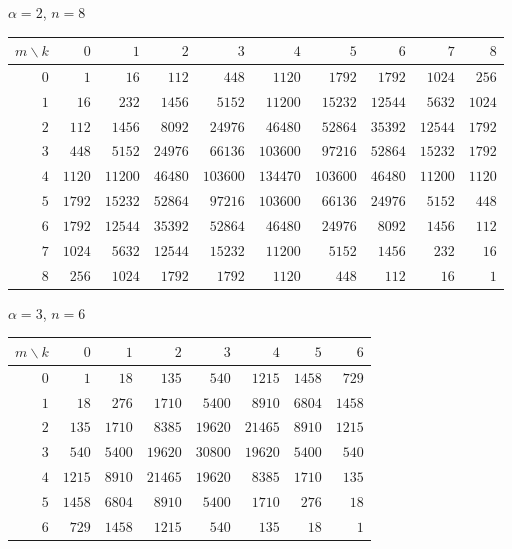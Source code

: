 \documentclass[11pt,a4paper]{article}
\theoremstyle{plain}
\theoremstyle{definition}
\begin{document}
\begin{tcolorbox}[colback=black!5, colframe=black!5, boxrule=0pt,
  sharp corners]
\begin{center}
$\alpha = 2$, $n = 8$

\medskip
\small
\begin{tabular}{r|rrrrrrrrr}
$m \!\backslash\! k$ & $0$ & $1$ & $2$ & $3$ & $4$ & $5$ & $6$ & $7$ & $8$ \\
\hline
$0$ & $1$ & $16$ & $112$ & $448$ & $1120$ & $1792$ & $1792$ & $1024$ & $256$ \\
$1$ & $16$ & $232$ & $1456$ & $5152$ & $11200$ & $15232$ & $12544$ & $5632$ & $1024$ \\
$2$ & $112$ & $1456$ & $8092$ & $24976$ & $46480$ & $52864$ & $35392$ & $12544$ & $1792$ \\
$3$ & $448$ & $5152$ & $24976$ & $66136$ & $103600$ & $97216$ & $52864$ & $15232$ & $1792$ \\
$4$ & $1120$ & $11200$ & $46480$ & $103600$ & $134470$ & $103600$ & $46480$ & $11200$ & $1120$ \\
$5$ & $1792$ & $15232$ & $52864$ & $97216$ & $103600$ & $66136$ & $24976$ & $5152$ & $448$ \\
$6$ & $1792$ & $12544$ & $35392$ & $52864$ & $46480$ & $24976$ & $8092$ & $1456$ & $112$ \\
$7$ & $1024$ & $5632$ & $12544$ & $15232$ & $11200$ & $5152$ & $1456$ & $232$ & $16$ \\
$8$ & $256$ & $1024$ & $1792$ & $1792$ & $1120$ & $448$ & $112$ & $16$ & $1$ \\
\end{tabular}
\end{center}
\end{tcolorbox}

\begin{tcolorbox}[colback=black!5, colframe=black!5, boxrule=0pt,
  sharp corners]
\begin{center}
$\alpha = 3$, $n = 6$

\medskip
\begin{tabular}{r|rrrrrrr}
$m \!\backslash\! k$ & $0$ & $1$ & $2$ & $3$ & $4$ & $5$ & $6$ \\
\hline
$0$ & $1$ & $18$ & $135$ & $540$ & $1215$ & $1458$ & $729$ \\
$1$ & $18$ & $276$ & $1710$ & $5400$ & $8910$ & $6804$ & $1458$ \\
$2$ & $135$ & $1710$ & $8385$ & $19620$ & $21465$ & $8910$ & $1215$ \\
$3$ & $540$ & $5400$ & $19620$ & $30800$ & $19620$ & $5400$ & $540$ \\
$4$ & $1215$ & $8910$ & $21465$ & $19620$ & $8385$ & $1710$ & $135$ \\
$5$ & $1458$ & $6804$ & $8910$ & $5400$ & $1710$ & $276$ & $18$ \\
$6$ & $729$ & $1458$ & $1215$ & $540$ & $135$ & $18$ & $1$ \\
\end{tabular}
\end{center}
\end{tcolorbox}
\end{document}
